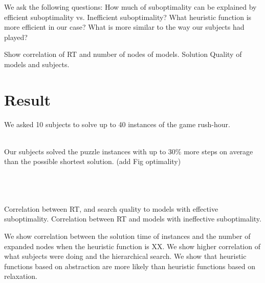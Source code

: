 \documentclass[10pt,letterpaper]{article}
\begin{document}
We ask the following questions: How much of suboptimality can be explained by efficient suboptimality vs. Inefficient suboptimality?
What heuristic function is more efficient in our case?
What is more similar to the way our subjects had played?

Show correlation of RT and number of nodes of models.
Solution Quality of models and subjects. 


\section{Result}
We asked 10 subjects to solve up to 40 instances of the game rush-hour.



\\

Our subjects solved the puzzle instances with up to 30\% more steps on average than the possible shortest solution. (add Fig optimality)


\\


\\

\\

Correlation between RT, and search quality to models with effective suboptimality.
Correlation between RT and models with ineffective suboptimality.

We show correlation between the solution time of instances and the number of expanded nodes when the heuristic function is XX. We show higher correlation of what subjects were doing and the hierarchical search. We show that heuristic functions based on abstraction are more likely than heuristic functions based on relaxation. 
\end{document}
